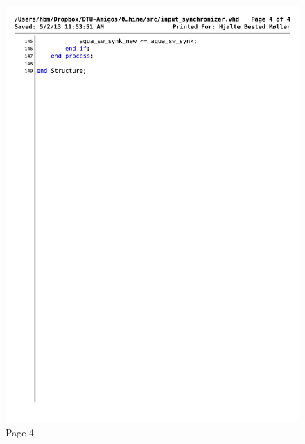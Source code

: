 \begin{figure}[!h]
\centering
\includegraphics[scale=0.6]{figs/input_synchronizer_4.pdf}
\caption{Page 4}
\label{vhd:inpsync4}
\end{figure}




